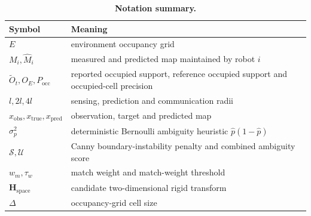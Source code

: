 \documentclass[11pt]{article}
\newcommand{\TableSetup}{%
  \footnotesize
  \setlength{\tabcolsep}{3pt}%
  \renewcommand{\arraystretch}{1.08}%
}
\begin{document}
\begin{table}[H]
  \centering
  \caption{\textbf{Notation summary.}}
  \TableSetup
  \begin{tabularx}{\textwidth}{@{}>{\raggedright\arraybackslash}p{}>{\raggedright\arraybackslash}X@{}}
    \toprule
    \rowcolor{TableHeader}
    \textbf{Symbol} & \textbf{Meaning} \\
    \midrule
    $E$ & environment occupancy grid \\
    $M_i,\hat M_i$ & measured and predicted map maintained by robot $i$ \\
    $\widetilde O_t,O_E,P_{\mathrm{occ}}$ & reported occupied support, reference occupied support and occupied-cell precision \\
    $l,2l,4l$ & sensing, prediction and communication radii \\
    $x_{\mathrm{obs}},x_{\mathrm{true}},x_{\mathrm{pred}}$ & observation, target and predicted map \\
    $\sigma_p^2$ & deterministic Bernoulli ambiguity heuristic $\hat p(1-\hat p)$ \\
    $\mathcal{S},\mathcal{U}$ & Canny boundary-instability penalty and combined ambiguity score \\
    $w_m,\tau_w$ & match weight and match-weight threshold \\
    $\mathbf{H}_{\mathrm{space}}$ & candidate two-dimensional rigid transform \\
    $\Delta$ & occupancy-grid cell size \\
    \bottomrule
  \end{tabularx}
\end{table}
\end{document}
